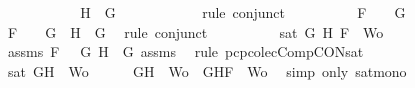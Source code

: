 \begin{isabellebody}
\ \ \ \ \ \ \ \ \isamarkupfalse%
\ \isamarkupfalse%
\ {\isachardoublequoteopen}H\ {\isacharequal}\ G{\isachardoublequoteclose}\isanewline
\ \ \ \ \ \ \ \ \ \ \isamarkupfalse%
\ {\isacharparenleft}rule\ conjunct{}{\isacharparenright}\isanewline
\ \ \ \ \ \ \ \ \isamarkupfalse%
\ {\isachardoublequoteopen}F\ {\isacharequal}\ \isactrlbold {\isasymnot}\ {\isacharparenleft}\isactrlbold {\isasymnot}\ G{\isacharparenright}{\isachardoublequoteclose}\isanewline
\ \ \ \ \ \ \ \ \ \ \isamarkupfalse%
\ {\isacartoucheopen}F\ {\isacharequal}\ \isactrlbold {\isasymnot}\ {\isacharparenleft}\isactrlbold {\isasymnot}\ G{\isacharparenright}\ {\isasymand}\ H\ {\isacharequal}\ G{\isacartoucheclose}\ \isamarkupfalse%
\ {\isacharparenleft}rule\ conjunct{}{\isacharparenright}\isanewline
\ \ \ \ \ \ \ \ \isamarkupfalse%
\ {\isachardoublequoteopen}sat\ {\isacharparenleft}{\isacharbraceleft}G{\isacharcomma}\ H{\isacharcomma}\ F{\isacharbraceright}\ {\isasymunion}\ Wo{\isacharparenright}{\isachardoublequoteclose}\isanewline
\ \ \ \ \ \ \ \ \ \ \isamarkupfalse%
\ assms{\isacharparenleft}{}{\isacharparenright}\ {\isacartoucheopen}F\ {\isacharequal}\ \isactrlbold {\isasymnot}{\isacharparenleft}\isactrlbold {\isasymnot}\ G{\isacharparenright}{\isacartoucheclose}\ {\isacartoucheopen}H\ {\isacharequal}\ G{\isacartoucheclose}\ assms{\isacharparenleft}{}{\isacharcomma}{}{\isacharcomma}{}{\isacharparenright}\ \isamarkupfalse%
\ {\isacharparenleft}rule\ pcp{\isacharunderscore}colecComp{\isacharunderscore}CON{\isacharunderscore}sat{}{\isacharparenright}\isanewline
\ \ \ \ \ \ \isamarkupfalse%
\isanewline
\ \ \ \ \isamarkupfalse%
\isanewline
\ \ \isamarkupfalse%
\isanewline
\ \ \isamarkupfalse%
\ {\isachardoublequoteopen}sat\ {\isacharparenleft}{\isacharbraceleft}G{\isacharcomma}H{\isacharbraceright}\ {\isasymunion}\ Wo{\isacharparenright}{\isachardoublequoteclose}\isanewline
\ \ \ \ \isamarkupfalse%
\ {\isacartoucheopen}{\isacharbraceleft}G{\isacharcomma}H{\isacharbraceright}\ {\isasymunion}\ Wo\ {\isasymsubseteq}\ {\isacharbraceleft}G{\isacharcomma}H{\isacharcomma}F{\isacharbraceright}\ {\isasymunion}\ Wo{\isacartoucheclose}\ \isamarkupfalse%
\ {\isacharparenleft}simp\ only{\isacharcolon}\ sat{\isacharunderscore}mono{\isacharparenright}\isanewline
{}\isamarkupfalse%

\end{isabellebody}
